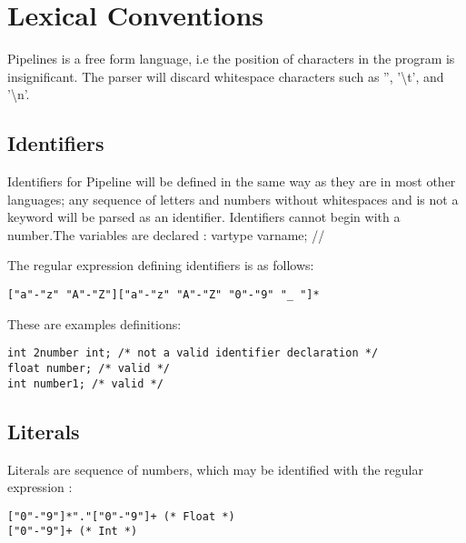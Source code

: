 \documentclass[./LRM_main.tex]{subfiles}
\begin{document}


\chapter{Lexical Conventions}

Pipelines is a free form language, i.e the position of characters in the program is insignificant. The parser will discard whitespace characters such as '', '\textbackslash t', and '\textbackslash n'. \\

\section{Identifiers}
Identifiers for Pipeline will be defined in the same way as they are in most other languages; any sequence of letters and numbers without whitespaces and is not a keyword will be parsed as an identifier. Identifiers cannot begin with a number.The variables are declared : vartype varname; //

The regular expression defining identifiers is as follows:  

\begin{lstlisting}
["a"-"z" "A"-"Z"]["a"-"z" "A"-"Z" "0"-"9" "_ "]*
\end{lstlisting}

These are examples definitions:

\begin{lstlisting}
int 2number int; /* not a valid identifier declaration */ 
float number; /* valid */ 
int number1; /* valid */
\end{lstlisting}

\section{Literals}
Literals are sequence of numbers, which may be identified with the regular expression : 
\begin{lstlisting}
["0"-"9"]*"."["0"-"9"]+ (* Float *)
["0"-"9"]+ (* Int *) 
\end{lstlisting}
\end{document}
